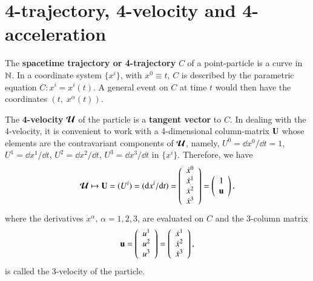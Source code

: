 \section{4-trajectory, 4-velocity and  4-acceleration}\label{chap16-sec3}

The \textbf{spacetime trajectory or 4-trajectory}  $C$ of a point-particle is a curve in  $\mathbb{N}$. In a coordinate system   $\{x^i\}$,  with $x^0\equiv t$, $C$ is described by the parametric equation  $C: x^i=x^i(t)$. A general event on  $C$ at time $t$ would then have the coordinates  $(t,\;x^\alpha (t))$. 

The  \textbf{4-velocity} $\bm{\mathcal{U}}$ of the particle is a \textbf{tangent vector} to  $C$. In dealing with the 4-velocity, it is convenient to work with a 4-dimensional column-matrix $\mathbf{U}$ whose elements    are the contravariant components of $\bm{\mathcal{U}}$, namely, $U^0=\dd x^0/\dd t=1$, $U^1=\dd x^1/\dd t$, $U^2= \dd x^2/\dd t$, $U^3=\dd x^3/\dd t$ in $\{x^i\}$. Therefore, we have
\setcounter{equation}{6}
\begin{equation}
\bm{\mathcal{U}}\mapsto{\mathbf{U}}=(U^i)=(\mathrm{d} x^i /\mathrm{d} t)=\left(\begin{array}{c} \dot{x}{}^{0}\\ \dot{x}{}^1\\ \dot{x}{}^2\\\dot{x}{}^3\end{array}\right)=  \left(\begin{array}{c} 1\\ \mathbf{u}\end{array}\right),\label{chap16-eq7}
\end{equation}
where the derivatives $\dot{x}{}^\alpha, \,\alpha= 1,2,3$, are evaluated on $C$ and the 3-column matrix  
\begin{equation}
\mathbf{u}=\left(\begin{array}{c}u^1\\ u^2\\ u^3\end{array}\right) =\left(\begin{array}{c}\dot{x}{}^1\\ \dot{x}{}^2\\ \dot{x}{}^3\end{array}\right),\label{chap16-eq8}
\end{equation}
is called the 3-velocity of the particle. 

